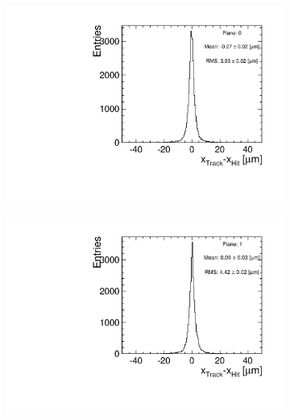 \begin{figure}[htbp] \centering
  \begin{subfigure}[b]{0.3\textwidth}
    \includegraphics[width=\textwidth]{figures/Telescope/biasedResiduals/BiasedResiduals_run49_PlaneXRMS0.pdf}
    \caption{}
  \end{subfigure}\hfill
  \begin{subfigure}[b]{0.3\textwidth}
    \includegraphics[width=\textwidth]{figures/Telescope/biasedResiduals/BiasedResiduals_run49_PlaneXRMS1.pdf}
    \caption{}
  \end{subfigure}\hfill
  \begin{subfigure}[b]{0.3\textwidth}

\end{subfigure}
\end{figure}
